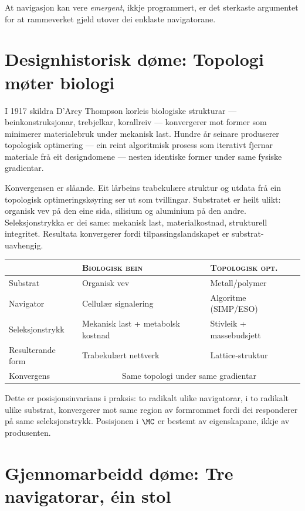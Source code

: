 At navigasjon kan vere \emph{emergent}, ikkje programmert, er det
sterkaste argumentet for at rammeverket gjeld utover dei enklaste
navigatorane.


\section{Designhistorisk døme: Topologi møter biologi}

I 1917 skildra D'Arcy Thompson korleis biologiske strukturar ---
beinkonstruksjonar, trebjelkar, korallreiv --- konvergerer mot
former som minimerer materialebruk under mekanisk last. Hundre år
seinare produserer topologisk optimering --- ein reint algoritmisk
prosess som iterativt fjernar materiale frå eit designdomene ---
nesten identiske former under same fysiske gradientar.

Konvergensen er slåande. Eit lårbeins trabekulære struktur og
utdata frå ein topologisk optimeringskøyring ser ut som tvillingar.
Substratet er heilt ulikt: organisk vev på den eine sida,
silisium og aluminium på den andre. Seleksjonstrykka er
dei same: mekanisk last, materialkostnad, strukturell integritet.
Resultata konvergerer fordi tilpassingslandskapet er
substrat-uavhengig.

\medskip
\begin{center}
\begin{tabular}{@{}lll@{}}
\toprule
& \textsc{Biologisk bein} & \textsc{Topologisk opt.} \\
\midrule
Substrat & Organisk vev & Metall/polymer \\
Navigator & Cellulær signalering & Algoritme (SIMP/ESO) \\
Seleksjonstrykk & Mekanisk last + metabolsk kostnad
  & Stivleik + massebudsjett \\
Resulterande form & Trabekulært nettverk & Lattice-struktur \\
Konvergens & \multicolumn{2}{c}{Same topologi under same gradientar} \\
\bottomrule
\end{tabular}
\end{center}

\medskip
Dette er posisjonsinvarians i praksis: to radikalt ulike
navigatorar, i to radikalt ulike substrat, konvergerer mot same
region av formrommet fordi dei responderer på same
seleksjonstrykk. Posisjonen i $\MC$ er bestemt av eigenskapane,
ikkje av produsenten.


\section{Gjennomarbeidd døme: Tre navigatorar, éin stol}

